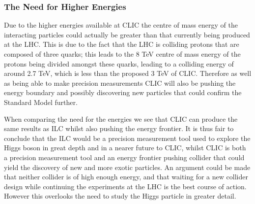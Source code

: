 %
%

\subsubsection{The Need for Higher Energies}
\label{higherEnergies}
Due to the higher energies available at CLIC the centre of mass energy of the interacting particles could actually be greater than that currently being produced at the LHC. This is due to the fact that the LHC is colliding protons that are composed of three quarks; this leads to the 8 TeV centre of mass energy \cite{ATLAS:8TeV} of the protons being divided amongst these quarks, leading to a colliding energy of around 2.7 TeV, which is less than the proposed 3 TeV of CLIC. Therefore as well as being able to make precision measurements CLIC will also be pushing the energy boundary and possibly discovering new particles that could confirm the Standard Model further.

When comparing the need for the energies we see that CLIC can produce the same results as ILC whilst also pushing the energy frontier. It is thus fair to conclude that the ILC would be a precision measurement tool used to explore the Higgs boson in great depth and in a nearer future to CLIC, whilst CLIC is both a precision measurement tool and an energy frontier pushing collider that could yield the discovery of new and more exotic particles. An argument could be made that neither collider is of high enough energy, and that waiting for a new collider design while continuing the experiments at the LHC is the best course of action. However this overlooks the need to study the Higgs particle in greater detail.

